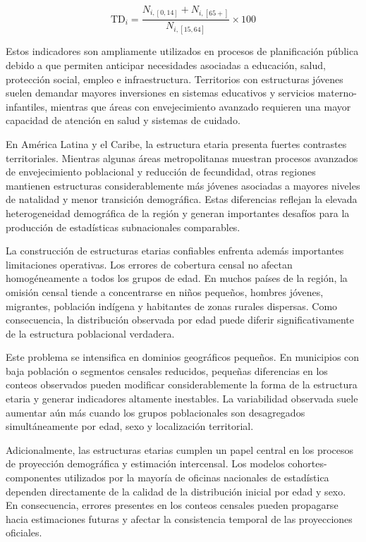 \documentclass[
  spanish,
]{book}
\begin{document}
\[
\text{TD}_i = \frac{N_{i,[0,14]} + N_{i,[65+]}}{N_{i,[15,64]}} \times 100
\]

Estos indicadores son ampliamente utilizados en procesos de planificación pública debido a que permiten anticipar necesidades asociadas a educación, salud, protección social, empleo e infraestructura. Territorios con estructuras jóvenes suelen demandar mayores inversiones en sistemas educativos y servicios materno-infantiles, mientras que áreas con envejecimiento avanzado requieren una mayor capacidad de atención en salud y sistemas de cuidado.

En América Latina y el Caribe, la estructura etaria presenta fuertes contrastes territoriales. Mientras algunas áreas metropolitanas muestran procesos avanzados de envejecimiento poblacional y reducción de fecundidad, otras regiones mantienen estructuras considerablemente más jóvenes asociadas a mayores niveles de natalidad y menor transición demográfica. Estas diferencias reflejan la elevada heterogeneidad demográfica de la región y generan importantes desafíos para la producción de estadísticas subnacionales comparables.

La construcción de estructuras etarias confiables enfrenta además importantes limitaciones operativas. Los errores de cobertura censal no afectan homogéneamente a todos los grupos de edad. En muchos países de la región, la omisión censal tiende a concentrarse en niños pequeños, hombres jóvenes, migrantes, población indígena y habitantes de zonas rurales dispersas. Como consecuencia, la distribución observada por edad puede diferir significativamente de la estructura poblacional verdadera.

Este problema se intensifica en dominios geográficos pequeños. En municipios con baja población o segmentos censales reducidos, pequeñas diferencias en los conteos observados pueden modificar considerablemente la forma de la estructura etaria y generar indicadores altamente inestables. La variabilidad observada suele aumentar aún más cuando los grupos poblacionales son desagregados simultáneamente por edad, sexo y localización territorial.

Adicionalmente, las estructuras etarias cumplen un papel central en los procesos de proyección demográfica y estimación intercensal. Los modelos cohortes-componentes utilizados por la mayoría de oficinas nacionales de estadística dependen directamente de la calidad de la distribución inicial por edad y sexo. En consecuencia, errores presentes en los conteos censales pueden propagarse hacia estimaciones futuras y afectar la consistencia temporal de las proyecciones oficiales.
\end{document}

